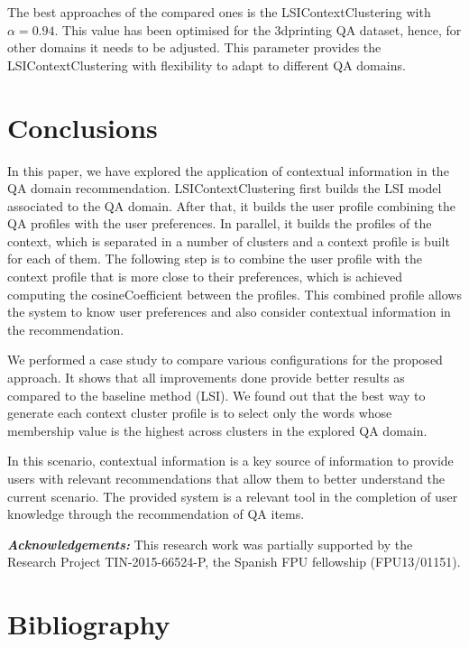 \documentclass[preprint]{elsarticle}
\begin{document}
\begin{spacing}{1.5}
The best approaches of the compared ones is the LSIContextClustering with $\alpha=0.94$. This value has been optimised for the 3dprinting QA dataset, hence, for other domains it needs to be adjusted. This parameter provides the LSIContextClustering with flexibility to adapt to different QA domains.

\section{Conclusions}
\label{sec:conclusions}

In this paper, we have explored the application of contextual information in the QA domain recommendation. LSIContextClustering first builds the LSI model associated to the QA domain. After that, it builds the user profile combining the QA profiles with the user preferences. In parallel, it builds the profiles of the context, which is separated in a number of clusters and a context profile is built for each of them. The following step is to combine the user profile with the context profile that is more close to their preferences, which is achieved computing the cosineCoefficient between the profiles. This combined profile allows the system to know user preferences and also consider contextual information in the recommendation. 

We performed a case study to compare various configurations for the proposed approach. It shows that all improvements done provide better results as compared to the baseline method (LSI). We found out that the best way to generate each context cluster profile is to select only the words whose membership value is the highest across clusters in the explored QA domain.

In this scenario, contextual information is a key source of information to provide users with relevant recommendations that allow them to better understand the current scenario. The provided system is a relevant tool in the completion of user knowledge through the recommendation of QA items.

\textbf{\textit{Acknowledgements:}} This research work was partially supported by the Research Project TIN-2015-66524-P, the Spanish FPU fellowship (FPU13/01151).

\section*{Bibliography}



\end{spacing}
\end{document}
